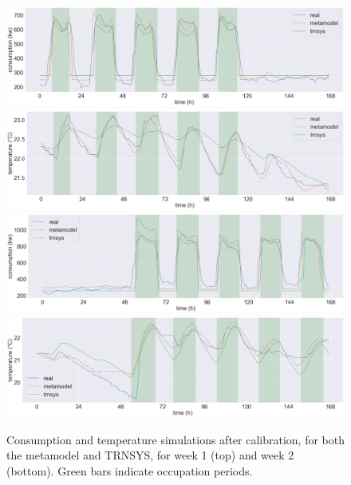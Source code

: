 \documentclass[12pt]{article}
\begin{document}
\begin{figure}
    \centering
    \includegraphics[width=\textwidth]{calib_week1_private.png}
    \includegraphics[width=\textwidth]{calib_week1_t_int.png}
    \includegraphics[width=\textwidth]{calib_week2_private.png}
    \includegraphics[width=\textwidth]{calib_week2_t_int.png}
    \caption{Consumption and temperature simulations after calibration, for both the metamodel and TRNSYS, for week 1 (top) and week 2 (bottom). Green bars indicate occupation periods.}%
    \label{fig:calib}
\end{figure}
\end{document}
